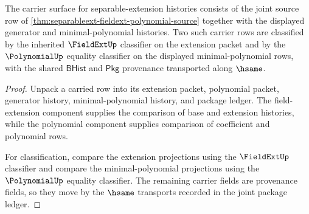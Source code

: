 \begin{theorem}
\label{thm:separableext-carrier-classifier-surface}
The carrier surface for separable-extension histories consists of the joint source row of \autoref{thm:separableext-fieldext-polynomial-source} together with the displayed generator and minimal-polynomial histories. Two such carrier rows are classified by the inherited $\FieldExtUp$ classifier on the extension packet and by the $\PolynomialUp$ equality classifier on the displayed minimal-polynomial rows, with the shared $\mathsf{BHist}$ and $\mathsf{Pkg}$ provenance transported along $\hsame$.
\end{theorem}
\begin{proof}
Unpack a carried row into its extension packet, polynomial packet, generator history, minimal-polynomial history, and package ledger. The field-extension component supplies the comparison of base and extension histories, while the polynomial component supplies comparison of coefficient and polynomial rows.

For classification, compare the extension projections using the $\FieldExtUp$ classifier and compare the minimal-polynomial projections using the $\PolynomialUp$ equality classifier. The remaining carrier fields are provenance fields, so they move by the $\hsame$ transports recorded in the joint package ledger.
\end{proof}

